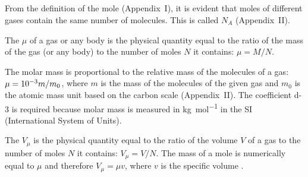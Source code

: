 \subsection{}\label{8.4.3} From the definition of the mole (Appendix~I), it is evident that moles of different gases contain the same number of mole­cules. This is called  $N_{A}$ (Appendix~II).

The  $\mu$ of a gas or any body is the physical quantity equal to the ratio of the mass of the gas (or any body) to the number of moles $N$ it contains: $\mu = M/N$.

The molar mass is proportional to the relative mass of the molecules of a gas: $\mu = \num{d-3} m/m_{0}$, where $m$ is the mass of the molecules of the given gas and $m_{0}$ is the atomic mass unit based on the carbon scale (Appendix~II). The coefficient \num{d-3} is required because molar mass is measured in \si{\kilo\gram\per\mole} in the SI (International System of Units).

The  $V_{\mu}$ is the physical quantity equal to the ratio of the volume $V$ of a gas to the number of moles $N$ it contains: $V_{\mu} = V/N$. The mass of a mole is numerically equal to $\mu$ and therefore $V_{\mu} = \mu v$, where $v$ is the specific volume .

